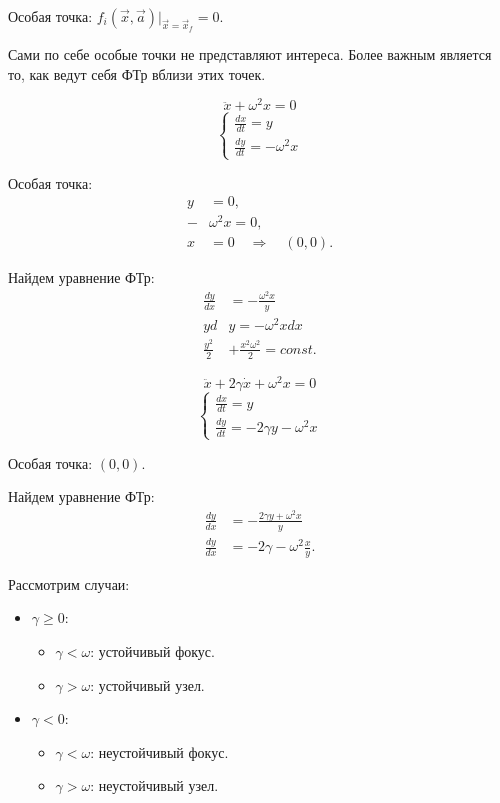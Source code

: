 Особая точка: $f_i(\vec{x}, \vec{a}) \Big|_{\vec{x}=\vec{x}_{f}}=0$.

Сами по себе особые точки не представляют интереса. Более важным является то, как ведут себя ФТр вблизи этих точек.

\begin{example}
	$$\ddot{x} + \omega^2 x = 0$$
	\begin{equation*}	
		\begin{cases}
			\frac{dx}{dt} = y \\
			\frac{dy}{dt} = -\omega^2 x
		\end{cases}	
	\end{equation*}
	
	Особая точка:
	\begin{align*}
		y &= 0, \\
		-&\omega^2 x = 0, \\
		x &= 0 \quad \Rightarrow \quad (0,0).
	\end{align*}
	
	Найдем уравнение ФТр:
	\begin{align*}
		\frac{dy}{dx} &= -\frac{\omega^2 x}{y} \\
		y d&y = -\omega^2 x dx \\
		\frac{y^2}{2} &+ \frac{x^2 \omega^2}{2} = const.
	\end{align*}
\end{example}

\begin{example}
	$$\ddot{x} + 2 \gamma \dot{x} + \omega^2 x = 0$$
	\begin{equation*}	
		\begin{cases}
			\frac{dx}{dt} = y \\
			\frac{dy}{dt} = -2 \gamma y - \omega^2 x
		\end{cases}	
	\end{equation*}
	
	Особая точка: $(0,0)$.

	Найдем уравнение ФТр:
	\begin{align*}
		\frac{dy}{dx} &= -\frac{2 \gamma y + \omega^2 x}{y} \\
		\frac{dy}{dx} &= -2 \gamma - \omega^2 \frac{x}{y}.
	\end{align*}
	
	Рассмотрим случаи:
	\begin{itemize}
		\item $\gamma \geq 0$:
		\begin{itemize}
			\item $\gamma < \omega$: устойчивый фокус.
			\item $\gamma > \omega$: устойчивый узел.
		\end{itemize}
		
		\item $\gamma < 0$:
		\begin{itemize}
			\item $\gamma < \omega$: неустойчивый фокус.
			\item $\gamma > \omega$: неустойчивый узел.
		\end{itemize}
	\end{itemize}
\end{example}

